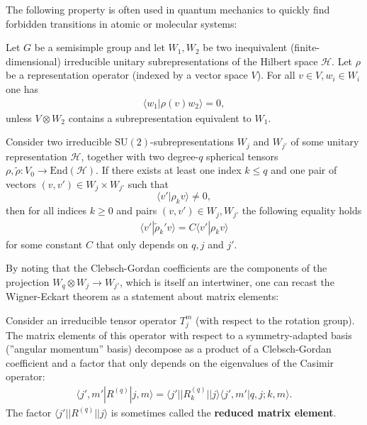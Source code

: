     The following property is often used in quantum mechanics to quickly find forbidden transitions in atomic or molecular systems:
    \begin{property}
        Let $G$ be a semisimple group and let $W_1,W_2$ be two inequivalent (finite-dimensional) irreducible unitary subrepresentations of the Hilbert space $\mathcal{H}$. Let $\rho$ be a representation operator (indexed by a vector space $V$). For all $v\in V,w_i\in W_i$ one has
        \begin{gather}
            \langle w_1|\rho(v)w_2\rangle = 0,
        \end{gather}
        unless $V\otimes W_2$ contains a subrepresentation equivalent to $W_1$.
    \end{property}

    \begin{theorem}
        Consider two irreducible $\mathrm{SU}(2)$-subrepresentations $W_j$ and $W_{j'}$ of some unitary representation $\mathcal{H}$, together with two degree-$q$ spherical tensors $\rho,\tilde{\rho}:V_0\rightarrow\mathrm{End}(\mathcal{H})$. If there exists at least one index $k\leq q$ and one pair of vectors $(v, v')\in W_j\times W_{j'}$ such that \[\langle v'|\rho_k v\rangle\neq 0,\] then for all indices $k\geq 0$ and pairs $(v,v')\in W_j,W_{j'}$ the following equality holds
        \begin{gather}
            \langle v'|\tilde{\rho}_k' v\rangle = C\langle v'|\rho_k v\rangle
        \end{gather}
        for some constant $C$ that only depends on $q, j$ and $j'$.
    \end{theorem}
    By noting that the Clebsch-Gordan coefficients are the components of the projection $W_q\otimes W_j\rightarrow W_{j'}$, which is itself an intertwiner, one can recast the Wigner-Eckart theorem as a statement about matrix elements:
    \begin{result}
        Consider an irreducible tensor operator $T_j^m$ (with respect to the rotation group). The matrix elements of this operator with respect to a symmetry-adapted basis (''angular momentum'' basis) decompose as a product of a Clebsch-Gordan coefficient and a factor that only depends on the eigenvalues of the Casimir operator:
        \begin{gather}
            \langle j',m'|R^{(q)}|j,m \rangle = \langle j'||R_k^{(q)}||j \rangle\langle j',m'|q,j;k,m \rangle.
        \end{gather}
        The factor $\langle j'||R^{(q)}||j \rangle$ is sometimes called the \textbf{reduced matrix element}.
    \end{result}